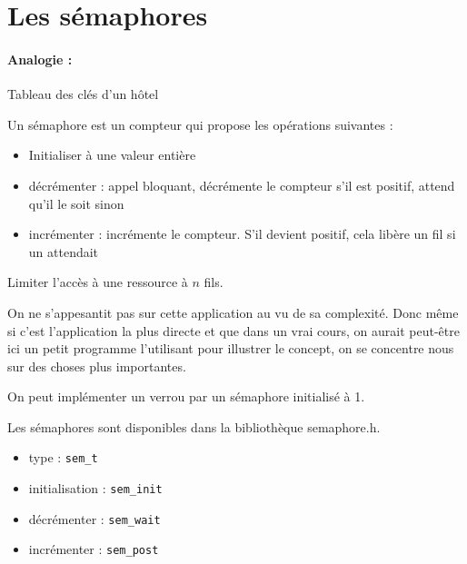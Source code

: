 \section{Les sémaphores}

\paragraph{Analogie :} Tableau des clés d'un hôtel

\begin{definition}
	Un sémaphore est un compteur qui propose les opérations suivantes :
	\begin{itemize}
		\item Initialiser à une valeur entière
		\item décrémenter : appel bloquant, décrémente le compteur s'il est positif, attend qu'il le soit sinon
		\item incrémenter : incrémente le compteur. S'il devient positif, cela libère un fil si un attendait
	\end{itemize} 
\end{definition}

\begin{appl}
	Limiter l'accès à une ressource à $n$ fils.
\end{appl}

\begin{com}
	On ne s’appesantit pas sur cette application au vu de sa complexité. Donc même si c'est l'application la plus directe et que dans un vrai cours, on aurait peut-être ici un petit programme l'utilisant pour illustrer le concept, on se concentre nous sur des choses plus importantes.
\end{com}

\begin{rem}
	On peut implémenter un verrou par un sémaphore initialisé à 1.
\end{rem}

\begin{impl}
	Les sémaphores sont disponibles dans la bibliothèque semaphore.h.
	\begin{itemize}
		\item type : \texttt{sem\_t}
		\item initialisation : \texttt{sem\_init}
		\item décrémenter : \texttt{sem\_wait}
		\item incrémenter : \texttt{sem\_post}
	\end{itemize}
\end{impl}

